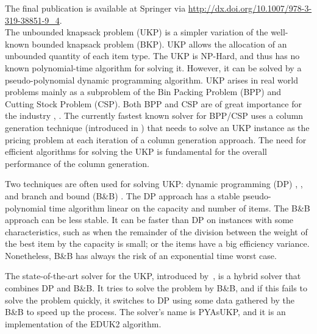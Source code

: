 \documentclass[runningheads,a4paper]{llncs}
\begin{document}
The final publication is available at Springer via \url{http://dx.doi.org/10.1007/978-3-319-38851-9_4}.\\

The unbounded knapsack problem (UKP) is a simpler variation of the well-known bounded knapsack problem (BKP).
UKP allows the allocation of an unbounded quantity of each item type.
The UKP is NP-Hard, and thus has no known polynomial-time algorithm for solving it. 
However, it can be solved by a pseudo-polynomial dynamic programming algorithm.
UKP arises in real world problems mainly as a subproblem of the Bin Packing Problem (BPP) and Cutting Stock Problem (CSP). 
Both BPP and CSP are of great importance for the industry \cite{survey2014}, \cite{gg-1,gg-2}. 
The currently fastest known solver for BPP/CSP\cite{belov,survey2014}
uses a column generation technique (introduced in \cite{gg-1}) that needs to solve an UKP instance as the pricing problem at each iteration of a column generation approach. 
The need for efficient algorithms for solving the UKP is fundamental for the overall performance of the column generation.

Two techniques are often used for solving UKP: dynamic programming (DP) \cite{eduk}, \cite[p. 214]{gar72}, \cite[p. 311]{tchu} and branch and bound (B\&B) \cite{mtu2}. 
The DP approach has a stable pseudo-polynomial time algorithm linear on the capacity and number of items. 
The B\&B approach can be less stable. 
It can be faster than DP on instances with some characteristics, such as when the remainder of the division between the weight of the best item by the capacity is small; or the items have a big efficiency variance. Nonetheless, B\&B has always the risk of an exponential time worst case.

The state-of-the-art solver for the UKP, introduced by~\cite{pya}, is a hybrid solver that combines DP and B\&B. 
It tries to solve the problem by B\&B, and if this fails to solve the problem quickly, it switches to DP using some data gathered by the B\&B to speed up the process. 
The solver's name is PYAsUKP, and it is an implementation of the EDUK2 algorithm.
\end{document}
